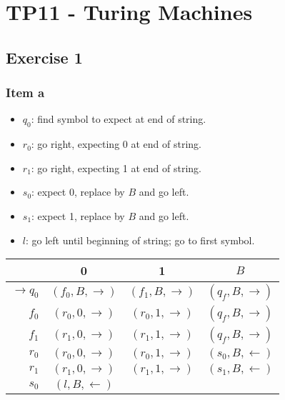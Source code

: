 \documentclass[docid=TP11]{tcom_TP}
\begin{document}
\setcounter{section}{10}
\section{TP11 - Turing Machines}
{
\renewcommand{\thesubsubsection}{\thesubsection\alph{subsubsection}}
\subsection{Exercise 1}
\subsubsection{Item a}
\begin{minipage}[c]{0.47\textwidth}
	\begin{itemize}
		\itemsep0em
		\item $q_0$: find symbol to expect at end of string.
		\item $r_0$: go right, expecting 0 at end of string.
		\item $r_1$: go right, expecting 1 at end of string.
		\item $s_0$: expect 0, replace by $B$ and go left.
		\item $s_1$: expect 1, replace by $B$ and go left.
		\item $l$: go left until beginning of string; go to first symbol.
	\end{itemize}
\end{minipage}
\begin{minipage}[c]{0.47\textwidth}
	\begin{center}
		\begin{tabular}{r | c  c  c}
			                  & 0                     & 1                     & $B$            \\ \hline
			$\rightarrow q_0$ & $(f_0,B,\rightarrow)$ & $(f_1,B,\rightarrow)$ & $(q_f,B,\rightarrow)$ \\
			$            f_0$ & $(r_0,0,\rightarrow)$ & $(r_0,1,\rightarrow)$ & $(q_f,B,\rightarrow)$ \\
			$            f_1$ & $(r_1,0,\rightarrow)$ & $(r_1,1,\rightarrow)$ & $(q_f,B,\rightarrow)$ \\
			$            r_0$ & $(r_0,0,\rightarrow)$ & $(r_0,1,\rightarrow)$ & $(s_0,B,\leftarrow )$ \\
			$            r_1$ & $(r_1,0,\rightarrow)$ & $(r_1,1,\rightarrow)$ & $(s_1,B,\leftarrow )$ \\
			$            s_0$ & $(l  ,B,\leftarrow )$ &                       &                       \\

\end{tabular}
\end{center}
\end{minipage}}
\end{document}
